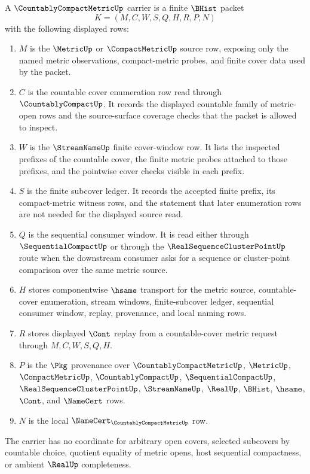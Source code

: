 \begin{definition}
\label{def:countably-compact-metric-carrier}
A $\CountablyCompactMetricUp$ carrier is a finite $\BHist$ packet
$$
K=(M,C,W,S,Q,H,R,P,N)
$$
with the following displayed rows:
\begin{enumerate}
\item $M$ is the $\MetricUp$ or $\CompactMetricUp$ source row, exposing only the named metric observations, compact-metric probes, and finite cover data used by the packet.
\item $C$ is the countable cover enumeration row read through $\CountablyCompactUp$. It records the displayed countable family of metric-open rows and the source-surface coverage checks that the packet is allowed to inspect.
\item $W$ is the $\StreamNameUp$ finite cover-window row. It lists the inspected prefixes of the countable cover, the finite metric probes attached to those prefixes, and the pointwise cover checks visible in each prefix.
\item $S$ is the finite subcover ledger. It records the accepted finite prefix, its compact-metric witness rows, and the statement that later enumeration rows are not needed for the displayed source read.
\item $Q$ is the sequential consumer window. It is read either through $\SequentialCompactUp$ or through the $\RealSequenceClusterPointUp$ route when the downstream consumer asks for a sequence or cluster-point comparison over the same metric source.
\item $H$ stores componentwise $\hsame$ transport for the metric source, countable-cover enumeration, stream windows, finite-subcover ledger, sequential consumer window, replay, provenance, and local naming rows.
\item $R$ stores displayed $\Cont$ replay from a countable-cover metric request through $M,C,W,S,Q,H$.
\item $P$ is the $\Pkg$ provenance over $\CountablyCompactMetricUp$, $\MetricUp$, $\CompactMetricUp$, $\CountablyCompactUp$, $\SequentialCompactUp$, $\RealSequenceClusterPointUp$, $\StreamNameUp$, $\RealUp$, $\BHist$, $\hsame$, $\Cont$, and $\NameCert$ rows.
\item $N$ is the local $\NameCert_{\CountablyCompactMetricUp}$ row.
\end{enumerate}
The carrier has no coordinate for arbitrary open covers, selected subcovers by countable choice, quotient equality of metric opens, host sequential compactness, or ambient $\RealUp$ completeness.
\end{definition}


